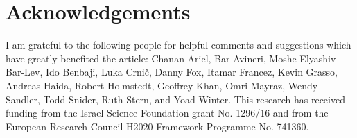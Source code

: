 \documentclass[output=paper]{langsci/langscibook}
\begin{document}
\section*{Acknowledgements}
I am grateful to the following people for helpful comments and suggestions which have greatly benefited the article: Chanan Ariel, Bar Avineri, \linebreak Moshe Elyashiv Bar-Lev, Ido Benbaji, Luka Crnič, Danny Fox, Itamar Francez, Kevin Grasso, Andreas Haida, Robert Holmstedt, Geoffrey Khan, Omri Mayraz, Wendy Sandler, Todd Snider, Ruth Stern, and Yoad Winter. This research has received funding from the Israel Science Foundation grant No. 1296/16  and from the European Research Council H2020 Framework Programme No. 741360.

{\sloppy\printbibliography[heading=subbibliography,notkeyword=this]}
\end{document}
